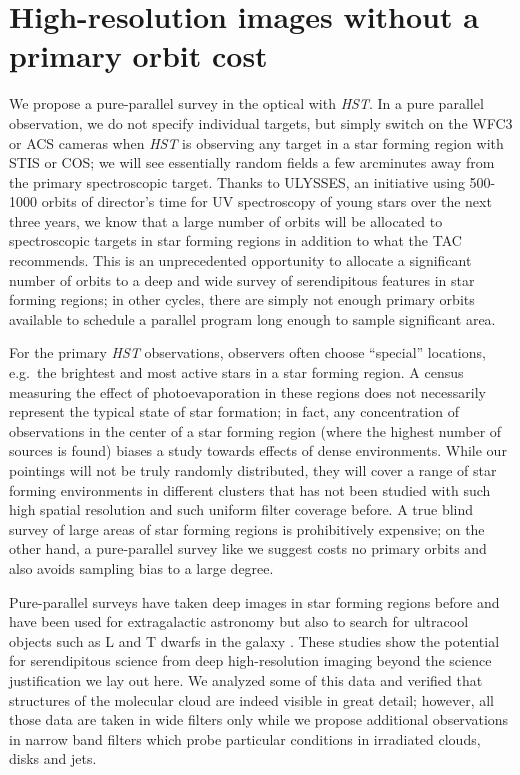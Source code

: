 \documentclass[12pt]{article}
\begin{document}
\section{High-resolution images without a primary orbit cost}
We propose a pure-parallel survey in the optical with \emph{HST}. In a pure
parallel observation, we do not specify individual targets, but simply switch
on the WFC3 or ACS cameras when \emph{HST} is observing any target in a star
forming region with STIS or COS; we will see essentially random fields a few
arcminutes away from the primary spectroscopic target. Thanks to ULYSSES, an
initiative using 500-1000 orbits of director's time for UV spectroscopy of
young stars over the next three years, we know that a large number of orbits
will be allocated to spectroscopic targets in star forming regions in addition
to what the TAC recommends. This is an unprecedented opportunity to allocate a significant number of orbits to a deep and wide survey of serendipitous features in star forming regions; in other cycles, there are simply not enough primary orbits available to schedule a parallel program long enough to sample significant area.

For the primary
\emph{HST} observations, observers often choose ``special'' locations,
e.g.\ the brightest and most active stars in a star forming region. A census
measuring the effect of photoevaporation in these regions does not necessarily
represent the typical state of star formation; in fact, any concentration of
observations in the center of a star forming region (where the highest number
of sources is found) biases a study towards effects of dense
environments. While our pointings will not be truly randomly distributed, they
will cover a range of star forming environments in different clusters that has
not been studied with such high spatial resolution and such uniform filter
coverage before. A true blind survey of large areas of star forming regions is prohibitively expensive; on the other hand, a pure-parallel survey like we suggest costs no primary orbits and also avoids sampling bias to a large degree.

Pure-parallel surveys have taken deep images in star forming regions before and
have been used for extragalactic astronomy \citep{2007A&A...468..823S} but also
to search for ultracool objects such as L and T dwarfs in the galaxy
\citep{2005ApJ...631L.159R}. These studies show the potential for serendipitous
science from deep high-resolution imaging beyond the science justification we
lay out here. We analyzed some of this data and verified that structures of the
molecular cloud are indeed visible in great detail; however, all those data are
taken in wide filters only while we propose additional observations in narrow
band filters which probe particular conditions in irradiated clouds, disks and
jets.
\end{document}
